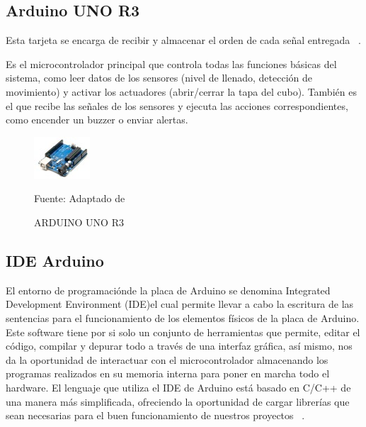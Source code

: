 \subsection{Arduino UNO R3}

Esta tarjeta se encarga de recibir y almacenar el orden de cada señal entregada ~\cite{buitrago}. 

Es el microcontrolador principal que controla todas las funciones básicas del sistema, como leer datos de los sensores (nivel de llenado, detección de movimiento) y activar los actuadores (abrir/cerrar la tapa del cubo). También es el que recibe las señales de los sensores y ejecuta las acciones correspondientes, como encender un buzzer o enviar alertas.


\begin{figure}[htb]
	\centering
	\includegraphics[scale  = 0.50]{Imagenes/uno3.jpg}
	\caption{ARDUINO UNO R3 }{Fuente: Adaptado de~\cite{mecafenix}}

\end{figure}

\subsection{IDE Arduino}

El entorno de programaciónde la  placa  de  Arduino  se denomina Integrated  Development  Environment (IDE)el cual  permite  llevar  a  cabo  la  escritura  de  las  sentencias para el funcionamiento de los elementos físicos de la placa de Arduino. Este   software   tiene   por   si   solo   un   conjunto   de herramientas que permite,  editar  el  código,  compilar  y depurar todo a través de una interfaz gráfica, así mismo, nos    da    la    oportunidad    de    interactuar    con    el microcontrolador almacenando los programas  realizados en  su  memoria  interna  para  poner  en  marcha  todo  el hardware. El lenguaje que utiliza el IDE de Arduino está basado en C/C++ de una manera más simplificada, ofreciendo la oportunidad de cargar librerías que sean necesarias para el buen funcionamiento de nuestros proyectos ~\cite{perez}.

